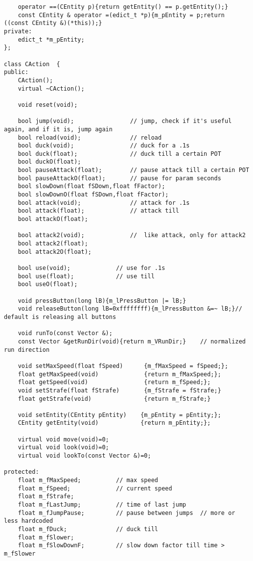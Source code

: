 \documentclass[12pt]{article}
\begin{document}
\begin{verbatim}
    operator ==(CEntity p){return getEntity() == p.getEntity();}
    const CEntity & operator =(edict_t *p){m_pEntity = p;return ((const CEntity &)(*this));}
private:
    edict_t *m_pEntity;
};

class CAction  {
public:
    CAction();
    virtual ~CAction();

    void reset(void);

    bool jump(void);                // jump, check if it's useful again, and if it is, jump again
    bool reload(void);              // reload
    bool duck(void);                // duck for a .1s
    bool duck(float);               // duck till a certain POT
    bool duckO(float);
    bool pauseAttack(float);        // pause attack till a certain POT
    bool pauseAttackO(float);       // pause for param seconds
    bool slowDown(float fSDown,float fFactor);
    bool slowDownO(float fSDown,float fFactor);
    bool attack(void);              // attack for .1s
    bool attack(float);             // attack till
    bool attackO(float);

    bool attack2(void);             //  like attack, only for attack2
    bool attack2(float);
    bool attack2O(float);

    bool use(void);             // use for .1s
    bool use(float);            // use till
    bool useO(float);

    void pressButton(long lB){m_lPressButton |= lB;}
    void releaseButton(long lB=0xffffffff){m_lPressButton &=~ lB;}// default is releasing all buttons

    void runTo(const Vector &);
    const Vector &getRunDir(void){return m_VRunDir;}    // normalized run direction

    void setMaxSpeed(float fSpeed)      {m_fMaxSpeed = fSpeed;};
    float getMaxSpeed(void)             {return m_fMaxSpeed;};
    float getSpeed(void)                {return m_fSpeed;};
    void setStrafe(float fStrafe)       {m_fStrafe = fStrafe;}
    float getStrafe(void)               {return m_fStrafe;}

    void setEntity(CEntity pEntity)    {m_pEntity = pEntity;};
    CEntity getEntity(void)            {return m_pEntity;};

    virtual void move(void)=0;
    virtual void look(void)=0;
    virtual void lookTo(const Vector &)=0;

protected:
    float m_fMaxSpeed;          // max speed
    float m_fSpeed;             // current speed
    float m_fStrafe;
    float m_fLastJump;          // time of last jump
    float m_fJumpPause;         // pause between jumps  // more or less hardcoded
    float m_fDuck;              // duck till
    float m_fSlower;
    float m_fSlowDownF;         // slow down factor till time > m_fSlower


\end{verbatim}
\end{document}
